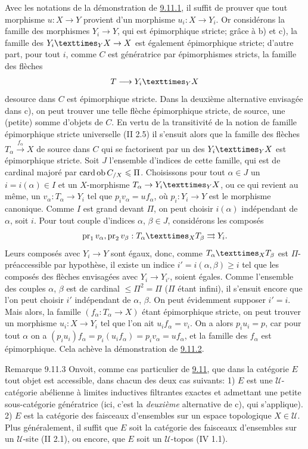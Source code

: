 \documentclass[10pt]{../fichiers-configuration-latex/smfart}
\begin{document}
Avec les notations de la démonstration de \hyperref[I.lem9.11.1]{9.11.1}, il suffit de
prouver que tout morphisme $u:X\rightarrow Y$ provient d'un
morphisme $u_i:X\rightarrow Y_i$. Or considérons la famille des
morphismes $Y_i\rightarrow Y$, qui est épimorphique stricte; grâce à
b) et c), la famille des $\fprod{Y_i}{X}{Y} \rightarrow X$ est
également épimorphique stricte; d'autre part, pour tout $i$, comme
$C$ est génératrice par épimorphismes stricts, la famille des
flèches
$$
T\longrightarrow \fprod{Y_i}{X}{Y}
$$
de\pageoriginale source dans $C$ est épimorphique stricte. Dans la
deuxième alternative envisagée dans c), on peut trouver une telle
flèche épimorphique stricte, de source, une (petite) somme d'objets
de $C$. En vertu de la transitivité de la notion de famille
épimorphique stricte universelle (II 2.5) il s'ensuit alors que la
famille des flèches $T_\alpha\xrightarrow{f_\alpha}X$ de source dans
$C$ qui se factorisent par un des $\fprod{Y_i}{X}{Y}$ est
épimorphique stricte. Soit $J$ l'ensemble d'indices de cette
famille, qui est de cardinal majoré par $\operatorname{card} \operatorname{ob} C_{/X}\leqslant \Pi$.
Choisissons pour tout $\alpha\in J$ un $i=i(\alpha)\in I$ et un
$X$-morphisme $T_\alpha\rightarrow \fprod{Y_i}{X}{Y}$, ou ce qui
revient au même, un $v_\alpha:T_\alpha\rightarrow Y_i$ tel que
$p_iv_\alpha=uf_\alpha$, où $p_i:Y_i\rightarrow Y$ est le morphisme
canonique. Comme $I$ est grand devant $\Pi$, on peut choisir
$i(\alpha)$ indépendant de $\alpha$, soit $i$. Pour tout couple
d'indices $\alpha$, $\beta\in J$, considérons les composés
$$
\pr_1 v_\alpha, \pr_2
v_\beta:\fprod{T_\alpha}{T_\beta}{X}\rightrightarrows Y_i{\quoi}.
$$
Leurs composés avec $Y_i\rightarrow Y$ sont égaux, donc, comme
$\fprod{T_\alpha}{T_\beta}{X}$ est $\Pi$-préaccessible par
hypothèse, il existe un indice $i'=i(\alpha,\beta)\geq i$ tel que
les composés des flèches envisagées avec $Y_i\rightarrow Y_{i'}$,
soient égales. Comme l'ensemble des couples $\alpha$, $\beta$ est de
cardinal $\leq \Pi^2=\Pi$ ($\Pi$ étant infini), il s'ensuit encore
que l'on peut choisir $i'$ indépendant de $\alpha$, $\beta$. On peut
évidemment supposer $i'=i$. Mais alors, la famille
$(f_\alpha:T_\alpha\rightarrow X)$ étant épimorphique stricte, on
peut trouver un morphisme $u_i:X\rightarrow Y_i$ tel que l'on ait
$u_if_\alpha=v_i$. On a alors $p_iu_i=p$, car pour tout $\alpha$ on
a $(p_iu_i)f_\alpha=p_i(u_if_\alpha)=p_iv_\alpha=uf_\alpha$, et la
famille des $f_\alpha$ est épimorphique. Cela achève la
démonstration de \hyperref[I.lem9.11.2]{9.11.2}.

\begin{enonce*}[remark]{Remarque 9.11.3}
On\pageoriginale voit, comme cas particulier de \hyperref[I.prop9.11]{9.11},
que dans la catégorie $E$ tout objet est accessible, dans chacun des
deux cas suivants: 1) $E$ est une $𝒰$-catégorie abélienne à
limites inductives filtrantes exactes et admettant une petite
sous-catégorie génératrice (ici, c'est la \emph{deuxième}
alternative de c), qui s'applique). 2) $E$ est la catégorie des
faisceaux d'ensembles sur un espace topologique $X\in 𝒰$.
Plus généralement, il suffit que $E$ soit la catégorie des faisceaux
d'ensembles sur un $𝒰$-site (II 2.1), ou encore, que $E$
soit un $𝒰$-topos (IV 1.1).
\end{enonce*}
\end{document}
